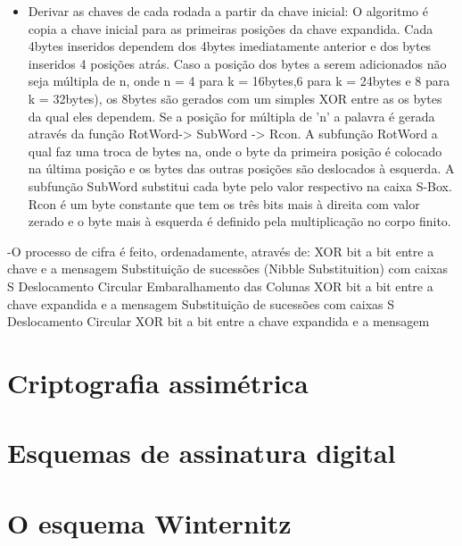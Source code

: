\documentclass{article}
\begin{document}
\begin{itemize}

\item Derivar as chaves de cada rodada a partir da chave inicial: O algoritmo é copia a chave inicial para as primeiras posições da chave expandida. Cada 4bytes inseridos dependem dos 4bytes imediatamente anterior e dos bytes inseridos 4 posições atrás. Caso a posição dos bytes a serem adicionados não seja múltipla de n, onde n = 4 para k = 16bytes,6 para k = 24bytes e 8 para k = 32bytes), os 8bytes são gerados com um simples XOR entre as os bytes da qual eles dependem. Se a posição for múltipla de 'n' a palavra é gerada através da função RotWord-> SubWord -> Rcon. A subfunção RotWord a qual faz uma troca de bytes na, onde o byte da primeira posição é colocado na última posição e os bytes das outras posições são deslocados à esquerda. A subfunção SubWord substitui cada byte pelo valor respectivo na caixa S-Box. Rcon é um byte constante que tem os três bits mais à direita com valor zerado e o byte mais à esquerda é definido pela multiplicação no corpo finito.


\end{itemize}
-O processo de cifra é feito, ordenadamente, através de: 
XOR bit a bit entre a chave e a mensagem
Substituição de sucessões (Nibble Substituition) com caixas S
Deslocamento Circular
Embaralhamento das Colunas
XOR bit a bit entre a chave expandida e a mensagem
Substituição de sucessões com caixas S
Deslocamento Circular
XOR bit a bit entre a chave expandida e a mensagem


\section*{Criptografia assimétrica}

\section*{Esquemas de assinatura digital}

\section*{O esquema Winternitz}


 
\end{document}
